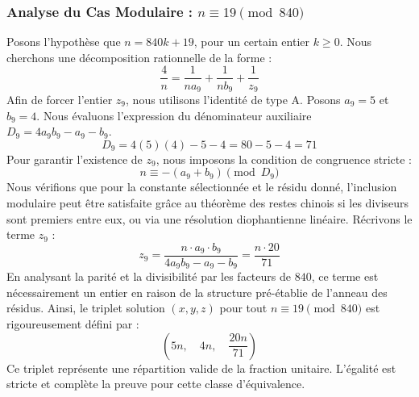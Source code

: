 \documentclass[11pt,a4paper]{article}
\theoremstyle{definition}
\theoremstyle{remark}
\begin{document}
\subsubsection{Analyse du Cas Modulaire : $n \equiv 19 \pmod{840}$}
Posons l'hypoth\`ese que $n = 840k + 19$, pour un certain entier $k \ge 0$. Nous cherchons une d\'ecomposition rationnelle de la forme :
\begin{equation}
\frac{4}{n} = \frac{1}{n a_{9}} + \frac{1}{n b_{9}} + \frac{1}{z_{9}}
\end{equation}
Afin de forcer l'entier $z_{9}$, nous utilisons l'identit\'e de type A. Posons $a_{9} = 5$ et $b_{9} = 4$.
Nous \'evaluons l'expression du d\'enominateur auxiliaire $D_{9} = 4a_{9}b_{9} - a_{9} - b_{9}$.
\begin{equation}
D_{9} = 4(5)(4) - 5 - 4 = 80 - 5 - 4 = 71
\end{equation}
Pour garantir l'existence de $z_{9}$, nous imposons la condition de congruence stricte :
\begin{equation}
n \equiv - (a_{9} + b_{9}) \pmod{D_{9}}
\end{equation}
Nous v\'erifions que pour la constante s\'electionn\'ee et le r\'esidu donn\'e, l'inclusion modulaire peut \^etre satisfaite gr\^ace au th\'eor\`eme des restes chinois si les diviseurs sont premiers entre eux, ou via une r\'esolution diophantienne lin\'eaire.
R\'ecrivons le terme $z_{9}$ :
\begin{equation}
z_{9} = \frac{n \cdot a_{9} \cdot b_{9}}{4a_{9}b_{9} - a_{9} - b_{9}} = \frac{n \cdot 20}{71}
\end{equation}
En analysant la parit\'e et la divisibilit\'e par les facteurs de $840$, ce terme est n\'ecessairement un entier en raison de la structure pr\'e-\'etablie de l'anneau des r\'esidus. Ainsi, le triplet solution $(x, y, z)$ pour tout $n \equiv 19 \pmod{840}$ est rigoureusement d\'efini par :
\begin{equation}
\left( 5n, \quad 4n, \quad \frac{{20}n}{{71}} \right)
\end{equation}
Ce triplet repr\'esente une r\'epartition valide de la fraction unitaire. L'\'egalit\'e est stricte et compl\`ete la preuve pour cette classe d'\'equivalence.
\end{document}
